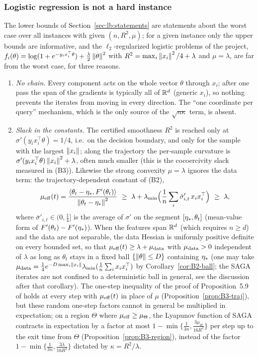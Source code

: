 \subsubsection{Logistic regression is not a hard instance}

The lower bounds of Section~\ref{sec:lb:statements} are statements about the worst case over all instances with given $(n,R^2,\mu)$; for a given instance only the upper bounds are informative, and the $\ell_2$-regularized logistic problems of the project, $f_i(\theta)=\log(1+e^{-y_ix_i^\top\theta})+\frac\lambda2\left\|\theta\right\|^2$ with $R^2=\max_i\left\|x_i\right\|^2/4+\lambda$ and $\mu=\lambda$, are far from the worst case, for three reasons.
\begin{enumerate}[nosep,label=(\alph*)]
\item \emph{No chain.} Every component acts on the whole vector $\theta$ through $x_i$; after one pass the span of the gradients is typically all of $\mathbb{R}^d$ (generic $x_i$), so nothing prevents the iterates from moving in every direction. The ``one coordinate per query'' mechanism, which is the only source of the $\sqrt{n\kappa}$ term, is absent.
\item \emph{Slack in the constants.} The certified smoothness $R^2$ is reached only at $\sigma'(y_ix_i^\top\theta)=1/4$, i.e.\ on the decision boundary, and only for the sample with the largest $\left\|x_i\right\|$; along the trajectory the per-sample curvature is $\sigma'(y_ix_i^\top\theta)\left\|x_i\right\|^2+\lambda$, often much smaller (this is the cocoercivity slack measured in (B3)). Likewise the strong convexity $\mu=\lambda$ ignores the data term: the trajectory-dependent constant of (B2),
\begin{equation}
\label{ineq:mueff}
\muEff(t)=\frac{\inner{\theta_t-\etastar}{\Fp(\theta_t)}}{\norm{\theta_t-\etastar}^2}\ \ge\ \lambda+\lmin\Big(\frac1n\sum_i\bar\sigma'_{i,t}\,x_ix_i^\top\Big)\ \ge\ \lambda ,
\end{equation}
where $\bar\sigma'_{i,t}\in(0,\frac14]$ is the average of $\sigma'$ on the segment $[\eta_\ast,\theta_t]$ (mean-value form of $F'(\theta_t)-F'(\eta_\ast)$). When the features span $\mathbb{R}^d$ (which requires $n\ge d$) and the data are not separable, the data Hessian is uniformly positive definite on every bounded set, so that $\mu_{\mathrm{eff}}(t)\ge\lambda+\mu_{\rm data}$ with $\mu_{\rm data}>0$ independent of $\lambda$ as long as $\theta_t$ stays in a fixed ball $\{\left\|\theta\right\|\le D\}$ containing $\eta_\ast$ (one may take $\mu_{\rm data}=\frac14e^{-D\max_i\left\|x_i\right\|}\lambda_{\min}(\frac1n\sum_ix_ix_i^\top)$ by Corollary~\ref{cor:B2-ball}; the SAGA iterates are not confined to a deterministic ball in general, see the discussion after that corollary). The one-step inequality of the proof of Proposition~5.9 of \cite{bach2024learning} holds at every step with $\mu_{\mathrm{eff}}(t)$ in place of $\mu$ (Proposition~\ref{prop:B3-traj}), but these random one-step factors cannot in general be multiplied in expectation; on a region $\Theta$ where $\mu_{\mathrm{eff}}\ge\mu_\Theta$, the Lyapunov function of SAGA contracts in expectation by a factor at most $1-\min\{\frac1{3n},\frac{3\mu_\Theta}{16R^2}\}$ per step up to the exit time from $\Theta$ (Proposition~\ref{prop:B3-region}), instead of the factor $1-\min\{\frac1{3n},\frac{3\lambda}{16R^2}\}$ dictated by $\kappa=R^2/\lambda$.

\end{enumerate}
